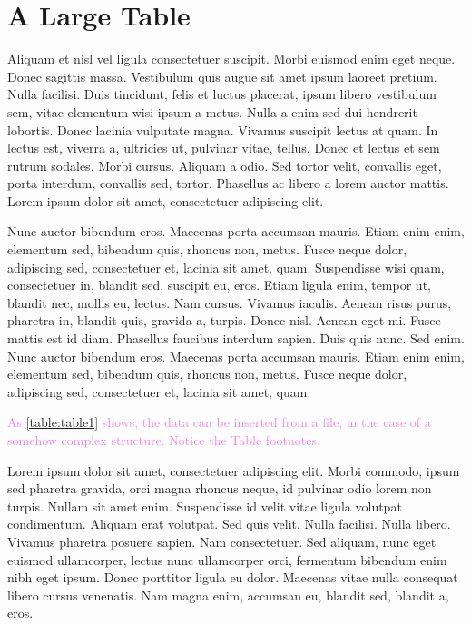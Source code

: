 \chapter{A Large Table}
\label{chapter:appendixB}

Aliquam et nisl vel ligula consectetuer suscipit. Morbi euismod enim eget neque. Donec sagittis massa. Vestibulum quis augue sit amet ipsum laoreet pretium. Nulla facilisi. Duis tincidunt, felis et luctus placerat, ipsum libero vestibulum sem, vitae elementum wisi ipsum a metus. Nulla a enim sed dui hendrerit lobortis. Donec lacinia vulputate magna. Vivamus suscipit lectus at quam. In lectus est, viverra a, ultricies ut, pulvinar vitae, tellus. Donec et lectus et sem rutrum sodales. Morbi cursus. Aliquam a odio. Sed tortor velit, convallis eget, porta interdum, convallis sed, tortor. Phasellus ac libero a lorem auctor mattis. Lorem ipsum dolor sit amet, consectetuer adipiscing elit.

Nunc auctor bibendum eros. Maecenas porta accumsan mauris. Etiam enim enim, elementum sed, bibendum quis, rhoncus non, metus. Fusce neque dolor, adipiscing sed, consectetuer et, lacinia sit amet, quam. Suspendisse wisi quam, consectetuer in, blandit sed, suscipit eu, eros. Etiam ligula enim, tempor ut, blandit nec, mollis eu, lectus. Nam cursus. Vivamus iaculis. Aenean risus purus, pharetra in, blandit quis, gravida a, turpis. Donec nisl. Aenean eget mi. Fusce mattis est id diam. Phasellus faucibus interdum sapien. Duis quis nunc. Sed enim.
Nunc auctor bibendum eros. Maecenas porta accumsan mauris. Etiam enim enim, elementum sed, bibendum quis, rhoncus non, metus. Fusce neque dolor, adipiscing sed, consectetuer et, lacinia sit amet, quam.



\textcolor{violet}{As \ref{table:table1} shows, the data can be inserted from a file, in the case of a somehow complex structure. Notice the Table footnotes.}	

Lorem ipsum dolor sit amet, consectetuer adipiscing elit. Morbi commodo, ipsum sed pharetra gravida, orci magna rhoncus neque, id pulvinar odio lorem non turpis. Nullam sit amet enim. Suspendisse id velit vitae ligula volutpat condimentum. Aliquam erat volutpat. Sed quis velit. Nulla facilisi. Nulla libero. Vivamus pharetra posuere sapien. Nam consectetuer. Sed aliquam, nunc eget euismod ullamcorper, lectus nunc ullamcorper orci, fermentum bibendum enim nibh eget ipsum. Donec porttitor ligula eu dolor. Maecenas vitae nulla consequat libero cursus venenatis. Nam magna enim, accumsan eu, blandit sed, blandit a, eros. 

